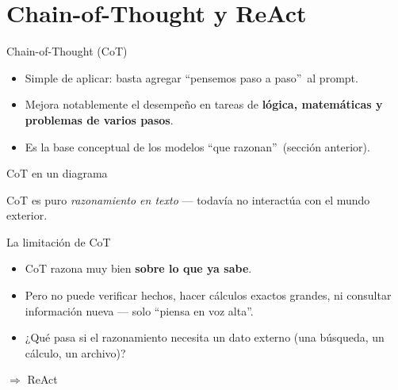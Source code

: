 \section{Chain-of-Thought y ReAct}

\begin{frame}{Chain-of-Thought (CoT)}
  \vfill
  \begin{itemize}
    \item Simple de aplicar: basta agregar ``pensemos paso a paso''\, al prompt.
    \item Mejora notablemente el desempeño en tareas de \textbf{lógica,
      matemáticas y problemas de varios pasos}.
    \item Es la base conceptual de los modelos ``que razonan''\ (sección anterior).
  \end{itemize}
\end{frame}

\begin{frame}{CoT en un diagrama}
  \centering
  \vfill
  \footnotesize CoT es puro \emph{razonamiento en texto} — todavía no
  interactúa con el mundo exterior.
\end{frame}

\begin{frame}{La limitación de CoT}
  \begin{itemize}
    \item CoT razona muy bien \textbf{sobre lo que ya sabe}.
    \item Pero no puede verificar hechos, hacer cálculos exactos grandes,
      ni consultar información nueva — solo ``piensa en voz alta''.
    \item ¿Qué pasa si el razonamiento necesita un dato externo
      (una búsqueda, un cálculo, un archivo)?
  \end{itemize}
  \vfill
  \centering
  \Large $\Rightarrow$ ReAct
\end{frame}


